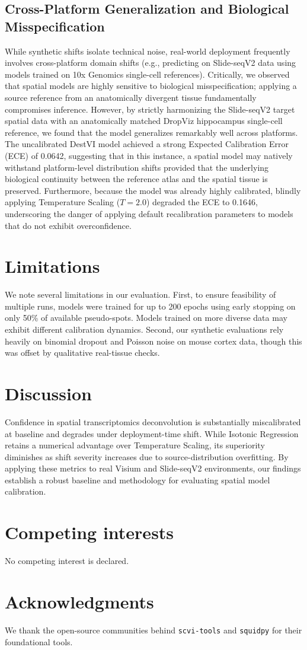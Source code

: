 \documentclass[unnumsec,webpdf,modern,large]{oup-authoring-template}
\begin{document}
\subsection{Cross-Platform Generalization and Biological Misspecification}
While synthetic shifts isolate technical noise, real-world deployment frequently involves cross-platform domain shifts (e.g., predicting on Slide-seqV2 data using models trained on 10x Genomics single-cell references). Critically, we observed that spatial models are highly sensitive to biological misspecification; applying a source reference from an anatomically divergent tissue fundamentally compromises inference. However, by strictly harmonizing the Slide-seqV2 target spatial data with an anatomically matched DropViz hippocampus single-cell reference, we found that the model generalizes remarkably well across platforms. The uncalibrated DestVI model achieved a strong Expected Calibration Error (ECE) of 0.0642, suggesting that in this instance, a spatial model may natively withstand platform-level distribution shifts provided that the underlying biological continuity between the reference atlas and the spatial tissue is preserved. Furthermore, because the model was already highly calibrated, blindly applying Temperature Scaling ($T=2.0$) degraded the ECE to 0.1646, underscoring the danger of applying default recalibration parameters to models that do not exhibit overconfidence.

\section{Limitations}
We note several limitations in our evaluation. First, to ensure feasibility of multiple runs, models were trained for up to 200 epochs using early stopping on only 50\% of available pseudo-spots. Models trained on more diverse data may exhibit different calibration dynamics. Second, our synthetic evaluations rely heavily on binomial dropout and Poisson noise on mouse cortex data, though this was offset by qualitative real-tissue checks.

\section{Discussion}
Confidence in spatial transcriptomics deconvolution is substantially miscalibrated at baseline and degrades under deployment-time shift. While Isotonic Regression retains a numerical advantage over Temperature Scaling, its superiority diminishes as shift severity increases due to source-distribution overfitting. By applying these metrics to real Visium and Slide-seqV2 environments, our findings establish a robust baseline and methodology for evaluating spatial model calibration.

\section{Competing interests}
No competing interest is declared.

\section{Acknowledgments}
We thank the open-source communities behind \texttt{scvi-tools} and \texttt{squidpy} for their foundational tools.



\end{document}
